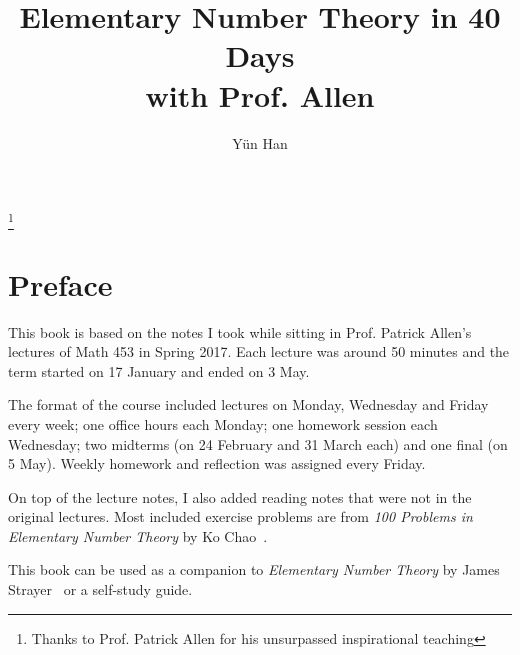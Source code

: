 \documentclass{amsbook}
\theoremstyle{plain}
\theoremstyle{definition}
\theoremstyle{remark}
\numberwithin{equation}{chapter}
\numberwithin{figure}{chapter}
\begin{document}
\frontmatter
\title[ENT40Days]{Elementary Number Theory in 40 Days \\
with Prof. Allen}
\author[Y\"un Han]{Y\"un Han}
\address{} %
\curraddr{}
\email{}
\urladdr{}
\thanks{Thanks to Prof. Patrick Allen for his unsurpassed inspirational teaching}
\author{} %
\subjclass{}
\dedicatory{}


\maketitle
\tableofcontents

\chapter*{Preface}

This book is based on the notes I took while sitting in Prof. Patrick Allen's lectures of Math 453 in Spring 2017. Each lecture was around 50 minutes and the term started on 17 January and ended on 3 May. 

The format of the course included lectures on Monday, Wednesday and Friday every week; one office hours each Monday; one homework session each Wednesday; two midterms (on 24 February and 31 March each) and one final (on 5 May). Weekly homework and reflection was assigned every Friday.

On top of the lecture notes, I also added reading notes that were not in the original lectures. Most included exercise problems are from \emph{100 Problems in Elementary Number Theory} by Ko Chao~\cite{Ko1980}.

This book can be used as a companion to \emph{Elementary Number Theory} by James Strayer~\cite{Strayer2001} or a self-study guide.
\end{document}

